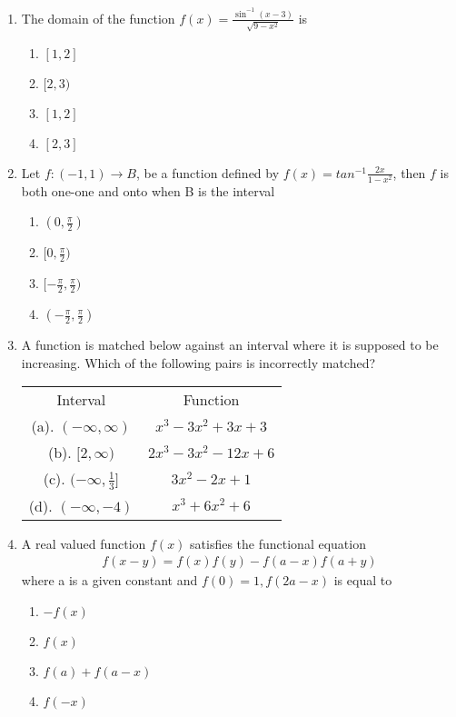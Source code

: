 \begin{enumerate}[label=\arabic*.,ref=\thesubsection.\theenumi]
\item The domain of the function $f(x)=\frac{\sin^{-1}(x-3)}{\sqrt{9-x^{2}}}$ is
\begin{enumerate}
\item $[1,2]$
\item $[2,3)$
\item $[1,2]$
\item $[2,3]$
\end{enumerate}

\item Let $f: (-1,1) \rightarrow B$, be a function defined by $f(x)=tan^{-1}\frac{2x}{1-x^2}$, then $f$ is both one-one and onto when B is the interval
\begin{enumerate}
\item $(0,\frac{\pi}{2})$
\item $[0,\frac{\pi}{2})$
\item $[-\frac{\pi}{2},\frac{\pi}{2})$
\item $(-\frac{\pi}{2},\frac{\pi}{2})$
\end{enumerate}

\item A function is matched below against an interval where it is supposed to be increasing. Which of the following pairs is incorrectly matched?
\begin{table}[h!]
\centering
\begin{tabular}{c c} 
 Interval & Function\\ [0.5ex] 
 (a). $(-\infty,\infty)$ & $x^3-3x^2+3x+3$\\ 
 (b). $[2,\infty)$ & $2x^3-3x^2-12x+6$\\
 (c). $(-\infty,\frac{1}{3}]$ & $3x^2-2x+1$\\
 (d). $(-\infty,-4)$ & $x^3+6x^2+6$\\[1ex] 
\end{tabular}
\end{table}

\item A real valued function $f(x)$ satisfies the functional equation 
\begin{align*}
f(x-y)=f(x)f(y)-f(a-x)f(a+y)
\end{align*} 
where a is a given constant and $f(0)=1, f(2a-x)$ is equal to 
\begin{enumerate}
\item $-f(x)$
\item $f(x)$
\item $f(a)+f(a-x)$
\item $f(-x)$
\end{enumerate}


\end{enumerate}
